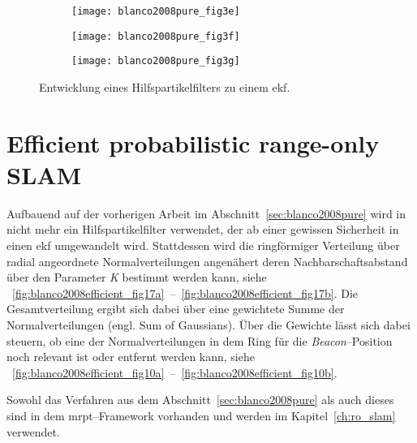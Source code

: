 \begin{figure}
	\begin{subfigure}[t]{0.3\linewidth}
		\texttt{[image: blanco2008pure\_fig3e]}
		\caption{}
		\label{fig:blanco2008pure_fig3e}
	\end{subfigure}
	\hfill
	\begin{subfigure}[t]{0.3\linewidth}
		\texttt{[image: blanco2008pure\_fig3f]}
		\caption{}
		\label{fig:blanco2008pure_fig3f}
	\end{subfigure}
	\hfill
	\begin{subfigure}[t]{0.3\linewidth}
		\texttt{[image: blanco2008pure\_fig3g]}
		\caption{}
		\label{fig:blanco2008pure_fig3g}
	\end{subfigure}
	\caption{Entwicklung eines Hilfspartikelfilters zu einem \Gls{ekf}.}
	\label{fig:blanco2008pure_fig3}
\end{figure}


\begin{comment}
------------------------------------------------------------------------------------------
- \cite{blanco2008efficient}
	- Efficient probabilistic range-only SLAM (71)
\end{comment}
\section{Efficient probabilistic range-only SLAM}\label{sec:blanco2008efficient}

Aufbauend auf der vorherigen Arbeit im Abschnitt~\ref{sec:blanco2008pure} wird in  \cite{blanco2008efficient} nicht mehr ein Hilfspartikelfilter verwendet, der ab einer gewissen Sicherheit in einen \Gls{ekf} umgewandelt wird. Stattdessen wird die ringförmiger Verteilung über radial angeordnete Normalverteilungen angenähert deren Nachbarschaftsabstand über den Parameter \textit{K} bestimmt werden kann, siehe \figurename~\ref{fig:blanco2008efficient_fig17a}~--~\ref{fig:blanco2008efficient_fig17b}. Die Gesamtverteilung ergibt sich dabei über eine gewichtete Summe der Normalverteilungen (engl. Sum of Gaussians). Über die Gewichte lässt sich dabei steuern, ob eine der Normalverteilungen in dem Ring für die \textit{Beacon}--Position noch relevant ist oder entfernt werden kann, siehe \figurename~\ref{fig:blanco2008efficient_fig10a}~--~\ref{fig:blanco2008efficient_fig10b}.

Sowohl das Verfahren aus dem Abschnitt~\ref{sec:blanco2008pure} als auch dieses sind in dem \Gls{mrpt}--Framework vorhanden und werden im Kapitel~\ref{ch:ro_slam} verwendet.


